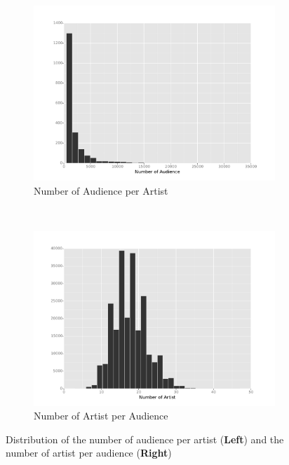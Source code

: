 \documentclass[11pt]{article}
\theoremstyle{definition}
\begin{document}
\begin{figure}[!h]
        \centering
        \begin{subfigure}[b]{0.45\textwidth}
                \includegraphics[width=\textwidth]{"./plots/hist_arts"}
                \caption{Number of Audience per Artist}
                \label{fig:gull}
        \end{subfigure}%
        ~
        \begin{subfigure}[b]{0.45\textwidth}
                \includegraphics[width=\textwidth]{"./plots/hist_user"}
                \caption{Number of Artist per Audience}
                \label{fig:tiger}
        \end{subfigure}
        \caption{Distribution of the number of audience per artist (\textbf{Left}) and the number of artist per audience (\textbf{Right})}
        \label{fig:freq}
\end{figure}
\end{document}
